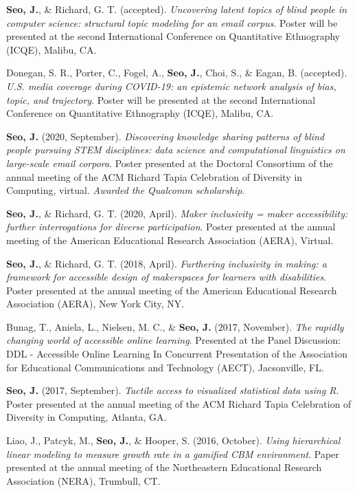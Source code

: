 \documentclass[11pt, a4paper]{awesome-cv}
\begin{document}
\textbf{Seo, J.}, \& Richard, G. T. (accepted). \emph{Uncovering latent
topics of blind people in computer science: structural topic modeling
for an email corpus}. Poster will be presented at the second
International Conference on Quantitative Ethnography (ICQE), Malibu, CA.

Donegan, S. R., Porter, C., Fogel, A., \textbf{Seo, J.}, Choi, S., \&
Eagan, B. (accepted). \emph{U.S. media coverage during COVID-19: an
epistemic network analysis of bias, topic, and trajectory}. Poster will
be presented at the second International Conference on Quantitative
Ethnography (ICQE), Malibu, CA.

\textbf{Seo, J.} (2020, September). \emph{Discovering knowledge sharing
patterns of blind people pursuing STEM disciplines: data science and
computational linguistics on large-scale email corpora}. Poster
presented at the Doctoral Consortium of the annual meeting of the ACM
Richard Tapia Celebration of Diversity in Computing, virtual.
\emph{Awarded the Qualcomm scholarship}.

\textbf{Seo, J.}, \& Richard, G. T. (2020, April). \emph{Maker
inclusivity = maker accessibility: further interrogations for diverse
participation}. Poster presented at the annual meeting of the American
Educational Research Association (AERA), Virtual.

\textbf{Seo, J.}, \& Richard, G. T. (2018, April). \emph{Furthering
inclusivity in making: a framework for accessible design of makerspaces
for learners with disabilities}. Poster presented at the annual meeting
of the American Educational Research Association (AERA), New York City,
NY.

Bunag, T., Aniela, L., Nielsen, M. C., \& \textbf{Seo, J.} (2017,
November). \emph{The rapidly changing world of accessible online
learning}. Presented at the Panel Discussion: DDL - Accessible Online
Learning In Concurrent Presentation of the Association for Educational
Communications and Technology (AECT), Jacsonville, FL.

\textbf{Seo, J.} (2017, September). \emph{Tactile access to visualized
statistical data using R}. Poster presented at the annual meeting of the
ACM Richard Tapia Celebration of Diversity in Computing, Atlanta, GA.

Liao, J., Patcyk, M., \textbf{Seo, J.}, \& Hooper, S. (2016, October).
\emph{Using hierarchical linear modeling to measure growth rate in a
gamified CBM environment}. Paper presented at the annual meeting of the
Northeastern Educational Research Association (NERA), Trumbull, CT.
\end{document}
